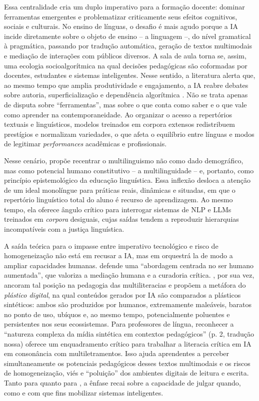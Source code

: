 \documentclass[portuguese]{textolivre}
\begin{document}
Essa centralidade cria um duplo imperativo para a formação docente: dominar ferramentas emergentes e problematizar criticamente seus efeitos cognitivos, sociais e culturais. No ensino de línguas, o desafio é mais agudo porque a IA incide diretamente sobre o objeto de ensino – a linguagem –, do nível gramatical à pragmática, passando por tradução automática, geração de textos multimodais e mediação de interações com públicos diversos. A sala de aula torna se, assim, uma ecologia socioalgorítmica na qual decisões pedagógicas são coformadas por docentes, estudantes e sistemas inteligentes. Nesse sentido, a literatura alerta que, ao mesmo tempo que amplia produtividade e engajamento, a IA reabre debates sobre autoria, superficialização e dependência algorítmica \cite{Sun2023, AmaroPires2024, Teng2025}. Não se trata apenas de disputa sobre “ferramentas”, mas sobre o que conta como saber e o que vale como aprender na contemporaneidade. Ao organizar o acesso a repertórios textuais e linguísticos, modelos treinados em corpora extensos redistribuem prestígios e normalizam variedades, o que afeta o equilíbrio entre línguas e modos de legitimar \textit{performances} acadêmicas e profissionais.

Nesse cenário, \textcite{Agnihotri2025} propõe recentrar o multilinguismo não como dado demográfico, mas como potencial humano constitutivo – a multilinguidade – e, portanto, como princípio epistemológico da educação linguística. Essa inflexão desloca a atenção de um ideal monolíngue para práticas reais, dinâmicas e situadas, em que o repertório linguístico total do aluno é recurso de aprendizagem. Ao mesmo tempo, ela oferece ângulo crítico para interrogar sistemas de NLP e LLMs treinados em \textit{corpora} desiguais, cujas saídas tendem a reproduzir hierarquias incompatíveis com a justiça linguística.

A saída teórica para o impasse entre imperativo tecnológico e risco de homogeneização não está em recusar a IA, mas em orquestrá la de modo a ampliar capacidades humanas. \textcite{Obrien2024} defende uma “abordagem centrada no ser humano aumentada”, que valoriza a mediação humana e a curadoria crítica. \textcite{RoeEtAl2025}, por sua vez, ancoram tal posição na pedagogia das multiliteracias e propõem a metáfora do \textit{plástico digital}, na qual conteúdos gerados por IA são comparados a plásticos sintéticos: ambos são produzidos por humanos, extremamente maleáveis, baratos no ponto de uso, ubíquos e, ao mesmo tempo, potencialmente poluentes e persistentes nos seus ecossistemas. Para professores de língua, reconhecer a “natureza complexa da mídia sintética em contextos pedagógicos” (p. 2, tradução nossa) oferece um enquadramento crítico para trabalhar a literacia crítica em IA em consonância com multiletramentos. Isso ajuda aprendentes a perceber simultaneamente os potenciais pedagógicos desses textos multimodais e os riscos de homogeneização, viés e “poluição” dos ambientes digitais de leitura e escrita. Tanto para \textcite{Obrien2024} quanto para \textcite{RoeEtAl2025}, a ênfase recai sobre a capacidade de julgar quando, como e com que fins mobilizar sistemas inteligentes.
\end{document}
